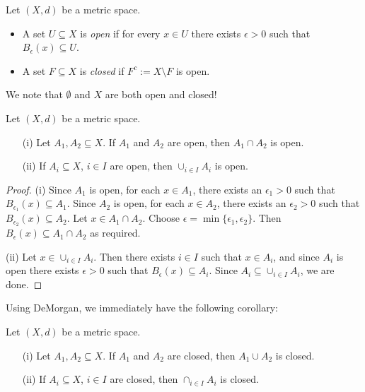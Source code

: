 \documentclass{article}
\begin{document}
\begin{definition}
Let $(X,d)$ be a metric space. 
\begin{itemize}
    \item A set $U \subseteq X$ is \emph{open} if for every $x \in U$ there exists $\epsilon>0$ such that $B_\epsilon(x) \subseteq U$.
    \item A set $F \subseteq X$ is \emph{closed} if $F^c:= X\setminus F$ is open.
\end{itemize}
\end{definition}

We note that $\emptyset$ and $X$ are both open and closed! 

\vspace{1em}

\begin{proposition}
\label{prop:open_sets}
Let $(X,d)$ be a metric space. 
 \begin{enumerate}
     \item[(i)] Let $A_1,A_2\subseteq X$. If $A_1$ and $A_2$ are open, then $A_1 \cap A_2$ is open.
     \item[(ii)] If $A_i \subseteq X$, $i \in I$ are open, then $\cup_{i\in I} A_i$ is open.
 \end{enumerate}
\end{proposition}
\begin{proof}
(i) Since $A_1$ is open, for each $x \in A_1$, there exists an $\epsilon_1 > 0$ such that $B_{\epsilon_1}(x) \subseteq  A_1$. Since $A_2$ is open, for each $x \in A_2$, there exists an $\epsilon_2 > 0$ such that $B_{\epsilon_2}(x) \subseteq A_2$. Let $x \in A_1 \cap A_2$. Choose $\epsilon = \min\{\epsilon_1,\epsilon_2\}$. Then  $B_{\epsilon}(x) \subseteq A_1 \cap A_2$ as required. 

(ii) Let $x\in \cup_{i\in I} A_i$. Then there exists $i \in I$ such that $x \in A_i$, and since $A_i$ is open there exists $\epsilon>0$ such that $B_\epsilon(x) \subseteq  A_i$. Since $A_i \subseteq \cup_{i\in I} A_i$, we are done.
\end{proof}

Using DeMorgan, we immediately have the following corollary:
\begin{corollary}
\label{cor:closed_sets}
Let $(X,d)$ be a metric space. 
 \begin{enumerate}
     \item[(i)] Let $A_1,A_2\subseteq X$. If $A_1$ and $A_2$ are closed, then $A_1 \cup A_2$ is closed.
     \item[(ii)]  If $A_i \subseteq X$, $i \in I$ are closed, then $\cap_{i\in I} A_i$ is closed.
 \end{enumerate}
\end{corollary}
\end{document}
